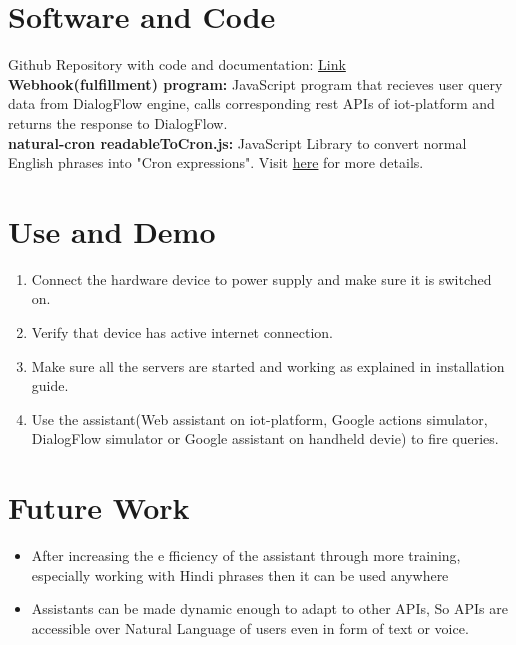 \documentclass[a4paper,12pt,oneside]{book}
\begin{document}
\section{Software and Code}
Github Repository with code and documentation: \href{https://github.com/eYSIP-2018/IFTTT-and-NLP}{Link}
\newline\\
\textbf{Webhook(fulfillment) program:}
\newline JavaScript program that recieves user query data from DialogFlow engine, calls corresponding rest APIs of iot-platform and returns the response to DialogFlow.
\newline\\
\textbf{natural-cron readableToCron.js:}
\newline JavaScript Library to convert normal English phrases into "Cron expressions". Visit \href{https://github.com/darkeyedevelopers/natural-cron.js}{here} for more details.

\section{Use and Demo}
\begin{enumerate}
\item Connect the hardware device to power supply and make sure it is switched on.
\item Verify that device has active internet connection.
\item Make sure all the servers are started and working as explained in installation guide.
\item Use the assistant(Web assistant on iot-platform, Google actions simulator, DialogFlow simulator or Google assistant on handheld devie) to fire queries.
\end{enumerate}

\section{Future Work}
\begin{itemize}
\item After increasing the e
fficiency of the assistant
 through more training, especially working
 with Hindi phrases then it can be used anywhere
\item Assistants can be made dynamic enough
 to adapt to other APIs, So APIs are accessible over
 Natural Language of users even in form of text
 or voice.
\end{itemize}
\end{document}
